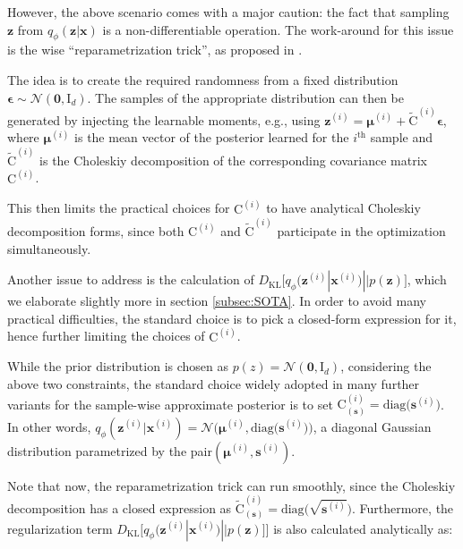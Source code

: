 \documentclass{article}
\begin{document}
However, the above scenario comes with a major caution: the fact that sampling $\mathbf{z}$ from $q_{\phi}(\mathbf{z} | \mathbf{x})$ is a non-differentiable operation. The work-around for this issue is the wise ``reparametrization trick'', as proposed in \cite{VAE}. 

The idea is to create the required randomness from a fixed distribution $\boldsymbol{\epsilon} \sim \mathcal{N}(\mathbf{0}, \mathrm{I}_d)$. The samples of the appropriate distribution can then be generated by injecting the learnable moments, e.g., using $\mathbf{z}^{(i)} = \boldsymbol{\mu}^{(i)} + \tilde{\mathrm{C}}^{(i)} \boldsymbol{\epsilon}$, where $\boldsymbol{\mu}^{(i)}$ is the mean vector of the posterior learned for the $i^{\text{th}}$ sample and $\tilde{\mathrm{C}}^{(i)}$ is the Choleskiy decomposition of the corresponding covariance matrix $\mathrm{C}^{(i)}$.

This then limits the practical choices for $\mathrm{C}^{(i)}$ to have analytical Choleskiy decomposition forms, since both $\mathrm{C}^{(i)}$ and $\tilde{\mathrm{C}}^{(i)}$ participate in the optimization simultaneously.

Another issue to address is the calculation of $D_{\text{KL}}\big[ q_{\phi}(\mathbf{z}^{(i)}  | \mathbf{x}^{(i)}) || p(\mathbf{z}) \big]$, which we elaborate slightly more in section \ref{subsec:SOTA}. In order to avoid many practical difficulties, the standard choice is to pick a closed-form expression for it, hence further limiting the choices of $\mathrm{C}^{(i)}$.

While the prior distribution is chosen as $p(z) = \mathcal{N}(\mathbf{0}, \mathrm{I}_d)$, considering the above two constraints, the standard choice widely adopted in many further variants for the sample-wise approximate posterior is to set $\mathrm{C}_{(\mathbf{s})}^{(i)} = \text{diag} \big( \mathbf{s}^{(i)} \big)$. In other words,  $q_{\phi}(\mathbf{z}^{(i)}  | \mathbf{x}^{(i)}) = \mathcal{N} \Big( \boldsymbol{\mu}^{(i)}, \text{diag} \big( \mathbf{s}^{(i)} \big)  \Big)$, a diagonal Gaussian distribution parametrized by the pair$(\boldsymbol{\mu}^{(i)}, \mathbf{s}^{(i)})$.

Note that now, the reparametrization trick can run smoothly, since the Choleskiy decomposition has a closed expression as $\tilde{\mathrm{C}}_{(\mathbf{s})}^{(i)} = \text{diag} \big( \sqrt{\mathbf{s}^{(i)}} \big) $. Furthermore, the regularization term $D_{\text{KL}}\big[ q_{\phi}(\mathbf{z}^{(i)}  | \mathbf{x}^{(i)}) || p(\mathbf{z}) \big] \Big]$ is also calculated analytically as:
\end{document}
